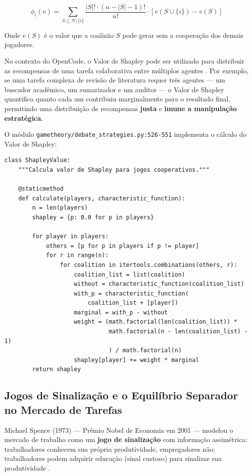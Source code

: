 \begin{equation}\label{eq:shapley}
\phi_i(v) = \sum_{S \subseteq N \setminus \{i\}} \frac{|S|! \cdot (n - |S| - 1)!}{n!} \cdot [v(S \cup \{i\}) - v(S)]
\end{equation}

Onde $v(S)$ é o valor que a coalizão $S$ pode gerar sem a cooperação dos demais jogadores.

No contexto do OpenCode, o Valor de Shapley pode ser utilizado para distribuir as recompensas de uma tarefa colaborativa entre múltiplos agentes \cite{agarwal2019explaining}. Por exemplo, se uma tarefa complexa de revisão de literatura requer três agentes --- um buscador acadêmico, um sumarizador e um auditor --- o Valor de Shapley quantifica quanto cada um contribuiu marginalmente para o resultado final, permitindo uma distribuição de recompensas \textbf{justa} e \textbf{imune a manipulação estratégica}.

O módulo \texttt{gametheory/debate\_strategies.py:526-551} implementa o cálculo do Valor de Shapley:

\begin{verbatim}
class ShapleyValue:
    """Calcula valor de Shapley para jogos cooperativos."""

    @staticmethod
    def calculate(players, characteristic_function):
        n = len(players)
        shapley = {p: 0.0 for p in players}

        for player in players:
            others = [p for p in players if p != player]
            for r in range(n):
                for coalition in itertools.combinations(others, r):
                    coalition_list = list(coalition)
                    without = characteristic_function(coalition_list)
                    with_p = characteristic_function(
                        coalition_list + [player])
                    marginal = with_p - without
                    weight = (math.factorial(len(coalition_list)) *
                              math.factorial(n - len(coalition_list) - 1)
                              ) / math.factorial(n)
                    shapley[player] += weight * marginal
        return shapley
\end{verbatim}

\subsection{Jogos de Sinalização e o Equilíbrio Separador no Mercado de Tarefas}

Michael Spence (1973) --- Prêmio Nobel de Economia em 2001 --- modelou o mercado de trabalho como um \textbf{jogo de sinalização} com informação assimétrica: trabalhadores conhecem sua própria produtividade, empregadores não; trabalhadores podem adquirir educação (sinal custoso) para sinalizar sua produtividade \cite{spence1973job}.

